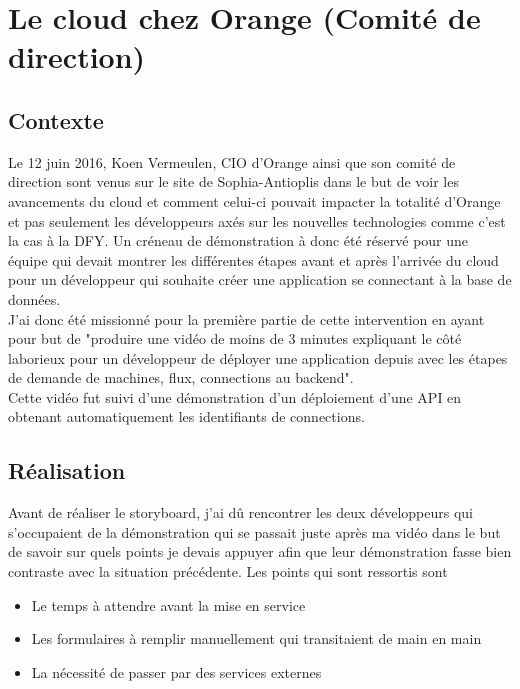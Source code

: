 \section{Le cloud chez Orange (Comité de direction)}
\subsection{Contexte}
Le 12 juin 2016, Koen Vermeulen, CIO d'Orange ainsi que son comité de direction sont venus sur le site de Sophia-Antioplis dans le but de voir les avancements du cloud et comment celui-ci pouvait impacter la totalité d'Orange et pas seulement les développeurs axés sur les nouvelles technologies comme c'est la cas à la DFY. Un créneau de démonstration à donc été réservé pour une équipe qui devait montrer les différentes étapes avant et après l'arrivée du cloud pour un développeur qui souhaite créer une application se connectant à la base de données.\\

J'ai donc été missionné pour la première partie de cette intervention en ayant pour but de "produire une vidéo de moins de 3 minutes expliquant le côté laborieux pour un développeur de déployer une application depuis avec les étapes de demande de machines, flux, connections au backend".\\

Cette vidéo fut suivi d'une démonstration d'un déploiement d'une API en obtenant automatiquement les identifiants de connections.

\subsection{Réalisation}
Avant de réaliser le storyboard, j'ai dû rencontrer les deux développeurs qui s'occupaient de la démonstration qui se passait juste après ma vidéo dans le but de savoir sur quels points je devais appuyer afin que leur démonstration fasse bien contraste avec la situation précédente. Les points qui sont ressortis sont

\begin{itemize}
    \item Le temps à attendre avant la mise en service
    \item Les formulaires à remplir manuellement qui transitaient de main en main
    \item La nécessité de passer par des services externes
\end{itemize}

